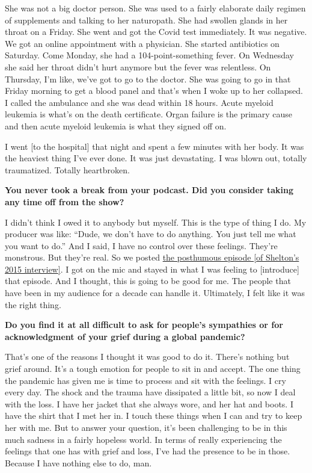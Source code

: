 She was not a big doctor person. She was used to a fairly elaborate
daily regimen of supplements and talking to her naturopath. She had
swollen glands in her throat on a Friday. She went and got the Covid
test immediately. It was negative. We got an online appointment with a
physician. She started antibiotics on Saturday. Come Monday, she had a
104-point-something fever. On Wednesday she said her throat didn't hurt
anymore but the fever was relentless. On Thursday, I'm like, we've got
to go to the doctor. She was going to go in that Friday morning to get a
blood panel and that's when I woke up to her collapsed. I called the
ambulance and she was dead within 18 hours. Acute myeloid leukemia is
what's on the death certificate. Organ failure is the primary cause and
then acute myeloid leukemia is what they signed off on.

I went {[}to the hospital{]} that night and spent a few minutes with her
body. It was the heaviest thing I've ever done. It was just devastating.
I was blown out, totally traumatized. Totally heartbroken.

\textbf{You never took a break from your podcast. Did you consider
taking any time off from the show?}

I didn't think I owed it to anybody but myself. This is the type of
thing I do. My producer was like: ``Dude, we don't have to do anything.
You just tell me what you want to do.'' And I said, I have no control
over these feelings. They're monstrous. But they're real. So we posted
\href{http://www.wtfpod.com/podcast/in-memoriam-remembering-lynn-shelton}{the
posthumous episode {[}of Shelton's 2015 interview{]}}. I got on the mic
and stayed in what I was feeling to {[}introduce{]} that episode. And I
thought, this is going to be good for me. The people that have been in
my audience for a decade can handle it. Ultimately, I felt like it was
the right thing.

\textbf{Do you find it at all difficult to ask for people's sympathies
or for acknowledgment of your grief during a global pandemic?}

That's one of the reasons I thought it was good to do it. There's
nothing but grief around. It's a tough emotion for people to sit in and
accept. The one thing the pandemic has given me is time to process and
sit with the feelings. I cry every day. The shock and the trauma have
dissipated a little bit, so now I deal with the loss. I have her jacket
that she always wore, and her hat and boots. I have the shirt that I met
her in. I touch these things when I can and try to keep her with me. But
to answer your question, it's been challenging to be in this much
sadness in a fairly hopeless world. In terms of really experiencing the
feelings that one has with grief and loss, I've had the presence to be
in those. Because I have nothing else to do, man.

